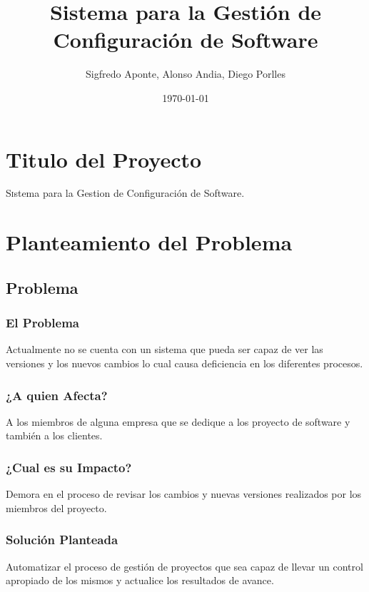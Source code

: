 \documentclass[twoside,twocolumn]{article}
\title{Sistema para la Gestión de Configuración de Software} %
\author{Sigfredo Aponte, Alonso Andia, Diego Porlles}
\date{\today} %
\begin{document}
\maketitle
\section{Titulo del Proyecto}
\lettrine[nindent=0em,lines=3]{S}istema para la Gestion de Configuración de Software.




\section{Planteamiento del Problema}
\subsection{Problema}
\subsubsection{El Problema}
Actualmente no se cuenta con un sistema que pueda ser capaz de ver las versiones y los nuevos cambios lo cual causa deficiencia en los diferentes procesos.

\subsubsection{¿A quien Afecta?}
A los miembros de alguna empresa que se dedique a los proyecto de software y también a los clientes.

\subsubsection{¿Cual es su Impacto?}

	Demora en el proceso de revisar los cambios y nuevas versiones realizados por los miembros del proyecto. 
\subsubsection{Solución Planteada}
	Automatizar el proceso de gestión de proyectos que sea capaz de llevar un control apropiado de los mismos y actualice los resultados de avance. 
\end{document}

